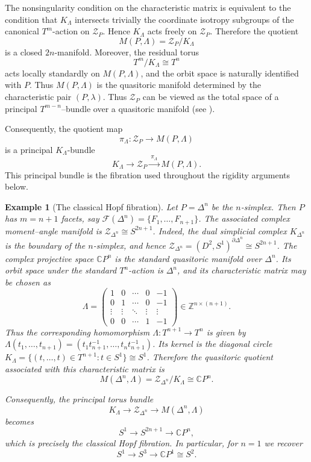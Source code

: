 \documentclass[11pt,a4paper]{article}
\numberwithin{equation}{section}
\newtheorem{example}[definition]{Example}
\theoremstyle{named}
\begin{document}
The nonsingularity condition on the characteristic matrix is equivalent to the condition that \(K_\Lambda\) intersects trivially the coordinate isotropy subgroups of the canonical \(T^m\)-action on \(\mathcal Z_P\). Hence \(K_\Lambda\) acts freely on \(\mathcal Z_P\).  Therefore the quotient
\[
    M(P,\Lambda)=\mathcal Z_P/K_\Lambda
\]
is a closed \(2n\)-manifold.  Moreover, the residual torus
\[
    T^m/K_\Lambda\cong T^n
\]
acts locally standardly on \(M(P,\Lambda)\), and the orbit space is naturally identified with \(P\).  Thus \(M(P,\Lambda)\) is the quasitoric manifold determined by the characteristic pair
\((P,\lambda)\). Thus $\mathcal Z_P$ can be viewed as the total space of a principal $T^{m-n}$--bundle over a quasitoric manifold (see \cite[Proposition 3.1.5]{bp00}).

Consequently, the quotient map
\[
    \pi_\Lambda:\mathcal Z_P\longrightarrow M(P,\Lambda)
\]
is a principal \(K_\Lambda\)-bundle
\[
    K_\Lambda
    \longrightarrow
    \mathcal Z_P
    \xrightarrow{\ \pi_\Lambda\ }
    M(P,\Lambda).
\]
This principal bundle is the fibration used throughout the rigidity arguments below.

\begin{example}[The classical Hopf fibration]
Let \(P=\Delta^n\) be the \(n\)-simplex.  Then \(P\) has \(m=n+1\) facets, say \(\mathcal F(\Delta^n)=\{F_1,\ldots,F_{n+1}\}\). The associated complex moment--angle manifold is \(\mathcal Z_{\Delta^n}\cong S^{2n+1}\). Indeed, the dual simplicial complex \(K_{\Delta^n}\) is the boundary of the \(n\)-simplex, and hence \(\mathcal Z_{\Delta^n}=(D^2,S^1)^{\partial\Delta^n}\cong S^{2n+1}\). The complex projective space \(\mathbb CP^n\) is the standard quasitoric manifold over \(\Delta^n\). Its orbit space under the standard \(T^n\)-action is \(\Delta^n\), and its characteristic matrix may be chosen as
\[
    \Lambda=
    \begin{pmatrix}
    1 & 0 & \cdots & 0 & -1\\
    0 & 1 & \cdots & 0 & -1\\
    \vdots & \vdots & \ddots & \vdots & \vdots\\
    0 & 0 & \cdots & 1 & -1
    \end{pmatrix}
    \in \mathbb Z^{n\times(n+1)}.
\]
Thus the corresponding homomorphism \(\Lambda:T^{n+1}\longrightarrow T^n\) is given by \(\Lambda(t_1,\ldots,t_{n+1}) =    (t_1t_{n+1}^{-1},\ldots,t_nt_{n+1}^{-1})\). Its kernel is the diagonal circle \(K_\Lambda =\{(t,\ldots,t)\in T^{n+1}:t\in S^1\}\cong S^1\). Therefore the quasitoric quotient associated with this characteristic matrix is
\[
    M(\Delta^n,\Lambda)
    =
    \mathcal Z_{\Delta^n}/K_\Lambda
    \cong
    \mathbb CP^n.
\]

Consequently, the principal torus bundle
\[
    K_\Lambda
    \longrightarrow
    \mathcal Z_{\Delta^n}
    \longrightarrow
    M(\Delta^n,\Lambda)
\]
becomes
\[
    S^1
    \longrightarrow
    S^{2n+1}
    \longrightarrow
    \mathbb CP^n,
\]
which is precisely the classical \emph{Hopf fibration}. In particular, for \(n=1\) we recover
\[
    S^1
    \longrightarrow
    S^3
    \longrightarrow
    \mathbb CP^1\cong S^2.
\]
\end{example}
\end{document}
